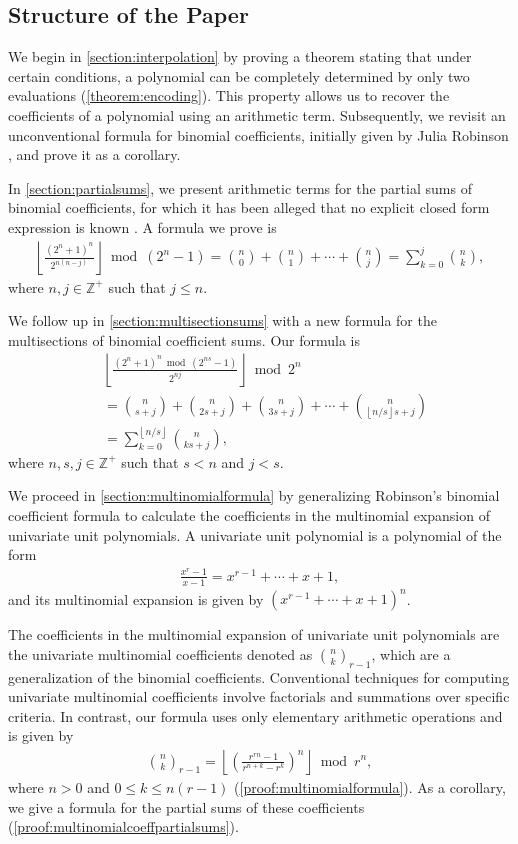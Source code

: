 \documentclass[10pt]{article}
\theoremstyle{plain}
\newcommand{\floor}[1]{\left\lfloor #1 \right\rfloor}
\newcommand{\Z}{\mathbb{Z}}
\begin{document}
\subsection{Structure of the Paper}
We begin in \cref{section:interpolation} by proving a theorem stating that under certain conditions, a polynomial can be completely determined by only two evaluations (\cref{theorem:encoding}). This property allows us to recover the coefficients of a polynomial using an arithmetic term. Subsequently, we revisit an unconventional formula for binomial coefficients, initially given by Julia Robinson \cite{robinson1952arithmetic}, and prove it as a corollary.

In \cref{section:partialsums}, we present arithmetic terms for the partial sums of binomial coefficients, for which it has been alleged that no explicit closed form expression is known \cite{boardman2004eggdropnumbers, wikipedia2024binomialcoefficient}. A formula we prove is
\begin{align*}
\floor{\frac{(2^n+1)^n}{2^{n(n-j)}}} \bmod (2^n-1)
= \binom{n}{0} + \binom{n}{1} + \cdots + \binom{n}{j}
= \sum_{k=0}^{j} \binom{n}{k} ,
\end{align*}
where $n,j \in \Z^+$ such that $j \leq n$.

We follow up in \cref{section:multisectionsums} with a new formula for the multisections of binomial coefficient sums. Our formula is
\begin{align*}
& \floor{\frac{(2^n+1)^n \bmod(2^{ns}-1)}{2^{nj}}} \bmod 2^n \\
&= \binom{n}{s+j} + \binom{n}{2s+j} + \binom{n}{3s+j} + \cdots + \binom{n}{\floor{n/s}s+j} \\
&= \sum_{k=0}^{\floor{n/s}} \binom{n}{ks+j} ,
\end{align*}
where $n,s,j \in \Z^+$ such that $s < n$ and $j < s$.

We proceed in \cref{section:multinomialformula} by generalizing Robinson's binomial coefficient formula to calculate the coefficients in the multinomial expansion of univariate unit polynomials. A univariate unit polynomial is a polynomial of the form
\begin{align*}
\frac{x^{r}-1}{x-1} = x^{r-1} + \cdots + x + 1  ,
\end{align*}
and its multinomial expansion is given by $(x^{r-1} + \cdots + x + 1)^n$.

The coefficients in the multinomial expansion of univariate unit polynomials are the univariate multinomial coefficients denoted as $\binom{n}{k}_{r-1}$, which are a generalization of the binomial coefficients. Conventional techniques for computing univariate multinomial coefficients involve factorials and summations over specific criteria. In contrast, our formula uses only elementary arithmetic operations and is given by
\begin{align*}
    \binom{n}{k}_{r-1} = \left\lfloor\left(\frac{r^{rn} - 1}{r^{n+k} - r^k}\right)^n\right\rfloor \bmod r^n ,
\end{align*}
where $n > 0$ and $0 \leq k \leq n (r-1)$ (\cref{proof:multinomialformula}). As a corollary, we give a formula for the partial sums of these coefficients (\cref{proof:multinomialcoeffpartialsums}).
\end{document}
